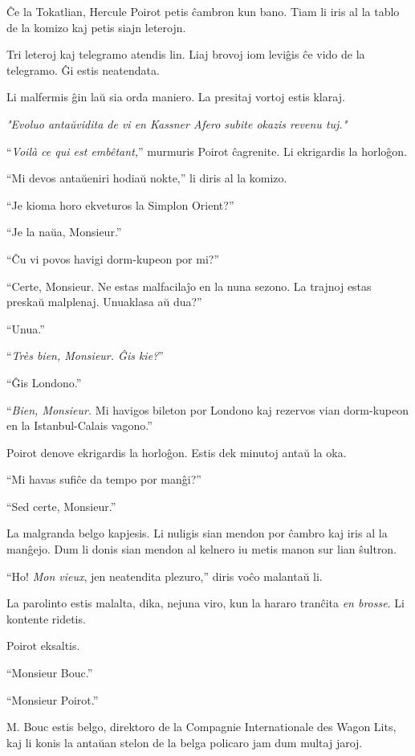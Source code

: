 Ĉe la Tokatlian, Hercule Poirot petis ĉambron kun bano. Tiam li iris al la tablo de la komizo kaj petis siajn leterojn.

Tri leteroj kaj telegramo atendis lin. Liaj brovoj iom leviĝis ĉe vido de la telegramo. Ĝi estis neatendata.

Li malfermis ĝin laŭ sia orda maniero. La presitaj vortoj estis klaraj.

\begin{center}\itshape "Evoluo antaŭvidita de vi en Kassner Afero subite okazis revenu tuj."\end{center}

``\emph{Voilà ce qui est embêtant,}'' murmuris Poirot ĉagrenite. Li ekrigardis la horloĝon.

``Mi devos antaŭeniri hodiaŭ nokte,'' li diris al la komizo.

``Je kioma horo ekveturos la Simplon Orient?''

``Je la naŭa, Monsieur.''

``Ĉu vi povos havigi dorm-kupeon por mi?''

``Certe, Monsieur. Ne estas malfacilaĵo en la nuna sezono. La trajnoj estas preskaŭ malplenaj. Unuaklasa aŭ dua?''

``Unua.''

``\emph{Très bien, Monsieur. Ĝis kie?}''

``Ĝis Londono.''

``\emph{Bien, Monsieur.} Mi havigos bileton por Londono kaj rezervos vian dorm-kupeon en la Istanbul-Calais vagono.''

Poirot denove ekrigardis la horloĝon. Estis dek minutoj antaŭ la oka.

``Mi havas sufiĉe da tempo por manĝi?''

``Sed certe, Monsieur.''

La malgranda belgo kapjesis. Li nuligis sian mendon por ĉambro kaj iris al la manĝejo. Dum li donis sian mendon al kelnero iu metis manon sur lian ŝultron.

``Ho! \emph{Mon vieux}, jen neatendita plezuro,'' diris voĉo malantaŭ li.

La parolinto estis malalta, dika, nejuna viro, kun la hararo tranĉita \emph{en brosse}. Li kontente ridetis.

Poirot eksaltis.

``Monsieur Bouc.''

``Monsieur Poirot.''

M. Bouc estis belgo, direktoro de la Compagnie Internationale des Wagon Lits, kaj li konis la antaŭan stelon de la belga policaro jam dum multaj jaroj.

